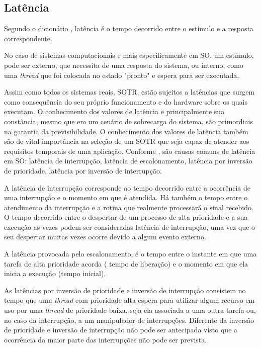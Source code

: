 \subsection{Latência}
Segundo o dicionário \cite{Priberam}, latência é o tempo decorrido entre o estímulo e a resposta correspondente.

No caso de sistemas computacionais e mais especificamente em SO, um estímulo, pode ser externo, que necessita de uma resposta do sistema, ou interno, como uma \textit{thread} que foi colocada no estado "pronto" e espera para ser executada.

Assim como todos os sistemas reais, SOTR, estão sujeitos a latências que surgem como consequência do seu próprio funcionamento e do hardware sobre os quais executam. O conhecimento dos valores de latência e principalmente sua constância, mesmo que em um cenário de sobrecarga do sistema, são primordiais na garantia da previsibilidade. O conhecimento dos valores de latência também são de vital importância na seleção de um SOTR que seja capaz de atender aos requisitos temporais de uma aplicação. Conforme \cite{Rostedt2007}, são causas comuns de latência em SO: latência de interrupção, latência de escalonamento, latência por inversão de prioridade, latência por inversão de interrupção.

A latência de interrupção corresponde ao tempo decorrido entre a ocorrência de uma interrupção e o momento em que é atendida. Há também o tempo entre o atendimento da interrupção e a rotina que realmente processará o sinal recebido. O tempo decorrido entre o despertar de um processo de alta prioridade e a sua execução as vezes podem ser consideradas latência de interrupção, uma vez que o seu despertar muitas vezes ocorre devido a algum evento externo. 

A latência provocada pelo escalonamento, é o tempo entre o instante em que uma tarefa de alta prioridade acorda ( tempo de liberação) e o momento em que ela inicia a execução (tempo inicial). 

As latências por inversão de prioridade e inversão de interrupção consistem no tempo que uma \textit{thread} com prioridade alta espera para utilizar algum recurso em uso por uma \textit{thread} de prioridade baixa, seja ela associada a uma outra tarefa ou, no caso da interrupção, a um manipulador de interrupções. Diferente da inversão de prioridade e inversão de interrupção não pode ser antecipada visto que a ocorrência da maior parte das interrupções não pode ser prevista.

